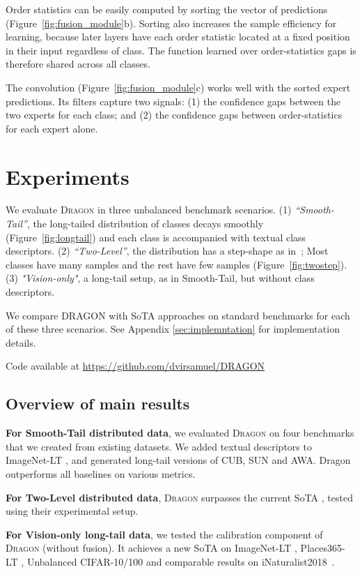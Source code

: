 \documentclass[10pt,twocolumn,letterpaper]{article}
\newcommand{\figref}[1]{Figure~\ref{#1}}
\newcommand{\DRAGON}{\textsc{Dragon}}
\newcommand{\SmoothTail}{Smooth-Tail}
\newcommand{\TwoLevel}{Two-Level}
\begin{document}
Order statistics can be easily computed by sorting the vector of predictions (\figref{fig:fusion_module}b). Sorting also increases the sample efficiency for learning, because later layers have each order statistic located at a fixed position in their input regardless of class. The function learned over order-statistics gaps is therefore shared across all classes.

The  convolution (\figref{fig:fusion_module}c) works well with the sorted expert predictions. Its filters capture two signals: (1) the confidence gaps between the two experts for each class; and (2) the confidence gaps between order-statistics for each expert alone.

\section{Experiments}
\label{sec:experimental setup overview}
We evaluate  \DRAGON{} in three unbalanced benchmark scenarios. (1) \textit{``\SmoothTail{}''}, the long-tailed distribution of classes decays smoothly (\figref{fig:longtail}) and each class is accompanied with textual class descriptors. (2) \textit{``\TwoLevel{}''}, the distribution has a step-shape as in~\cite{Schnfeld2019GeneralizedZL}; Most classes have many samples and the rest have few samples (\figref{fig:twostep}). 
(3) \textit{"Vision-only"}, a long-tail setup, as in \SmoothTail{}, but without class descriptors.

We compare DRAGON with SoTA approaches on standard benchmarks for each of these three scenarios. See Appendix \ref{sec:implemntation} for implementation details. 

Code available at \url{https://github.com/dvirsamuel/DRAGON}

\subsection{Overview of main results}
\textbf{For \SmoothTail{} distributed data}, we evaluated \DRAGON{} on four  benchmarks that we created from existing datasets. We added textual descriptors to ImageNet-LT \cite{openlongtailrecognition}, and generated long-tail versions of CUB, SUN and AWA. Dragon outperforms all baselines on various metrics. 

\textbf{For \TwoLevel{} distributed data}, \DRAGON{} surpasses the current SoTA \cite{Schnfeld2019GeneralizedZL}, tested using their experimental setup. 

\textbf{For Vision-only long-tail data}, we tested the calibration component of \DRAGON{} (without fusion). It achieves a new SoTA on ImageNet-LT \cite{openlongtailrecognition}, Places365-LT \cite{openlongtailrecognition}, Unbalanced CIFAR-10/100 \cite{cao2019learning} and comparable results on iNaturalist2018~\cite{Horn2017TheIC}.
\end{document}
